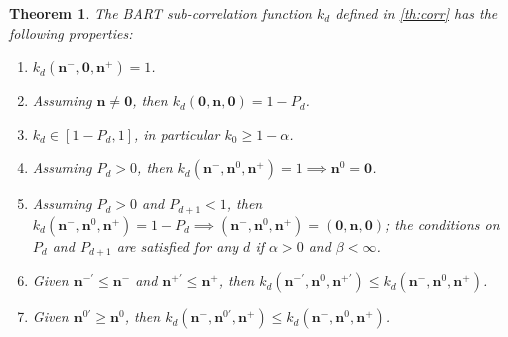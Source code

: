 \documentclass[a4paper]{article}
\newcommand{\nvecs}{\mathbf n^-, \mathbf n^0, \mathbf n^+}
\newtheorem{theorem}{Theorem}
\theoremstyle{definition}
\let\oldmarginpar\marginpar
\renewcommand{\marginpar}[1]{\oldmarginpar{\sffamily\scriptsize #1}}
\renewcommand{\marginpar}[1]{\relax} %
\begin{document}
    \begin{theorem}
        \label{th:corrprop}
        The BART sub-correlation function $k_d$ defined in \autoref{th:corr} has the following properties:
        \begin{enumerate}
            
            \item $k_d(\mathbf n^-, \mathbf 0, \mathbf n^+) = 1$. \label{it:corr1}
            
            \item Assuming $\mathbf n \ne \mathbf 0$, then $k_d(\mathbf 0, \mathbf n, \mathbf 0) = 1 - P_d$. \label{it:lower}
            
            \item $k_d \in [1 - P_d, 1]$, in particular $k_0 \ge 1 - \alpha$. \label{it:bounds}
            
            \item Assuming $P_d > 0$, then $k_d(\nvecs) = 1 \implies \mathbf n^0 = \mathbf 0$. \label{it:center}
            
            \item Assuming $P_d > 0$ and $P_{d+1} < 1$, then $k_d(\nvecs) = 1 - P_d \implies (\nvecs) = (\mathbf 0, \mathbf n, \mathbf 0)$; the conditions on $P_d$ and $P_{d+1}$ are satisfied for any $d$ if $\alpha > 0$ and $\beta < \infty$. \label{it:corner}
            
            \item Given $\mathbf n^{-\prime} \le \mathbf n^-$ and $\mathbf n^{+\prime} \le \mathbf n^+$, then $k_d(\mathbf n^{-\prime}, \mathbf n^0, \mathbf n^{+\prime}) \le k_d(\mathbf n^-, \mathbf n^0, \mathbf n^+)$. \label{it:monoext}
            
            \item Given $\mathbf n^{0\prime} \ge \mathbf n^0$, then $k_d(\mathbf n^-, \mathbf n^{0\prime}, \mathbf n^+) \le k_d(\mathbf n^-, \mathbf n^0, \mathbf n^+)$. \label{it:monoint} \marginpar{Additional properties: I guess that if $\mathbf n' = \mathbf n$, $\mathbf n^{0\prime} = \mathbf n^0$, $|\mathbf n^{-\prime} - \mathbf n^{+\prime}| \le |\mathbf n^- - \mathbf n^+|$, then $k_d(\mathbf n^{-\prime}, \mathbf n^{0\prime}, \mathbf n^{+\prime}) \ge k_d(\nvecs)$. And how does $k_d(\nvecs)$ compare to $k_d(N\mathbf n^-, N\mathbf n^0, N\mathbf n^+)$?}
            

\end{enumerate}
\end{theorem}
\end{document}
